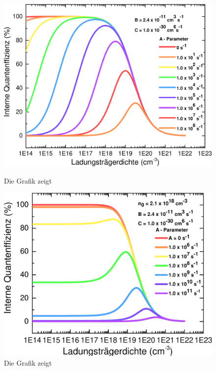 \begin{figure}[H]
    \centering
    \begin{minipage}[t]{0.49\linewidth}
        \centering
        \includegraphics[width=\linewidth]{Bilder/IQEohneDotierungVerschAParams.pdf}
        \caption{Die Grafik zeigt}
        \label{fig:iqenorm}
    \end{minipage}%
    \hfill
    \begin{minipage}[t]{0.49\linewidth}
        \centering
        \includegraphics[width=\linewidth]{Bilder/IQEmitDotierungVerschAParams.pdf}
        \caption{Die Grafik zeigt  }
        \label{fig:iqedot}
    \end{minipage}
\end{figure}
